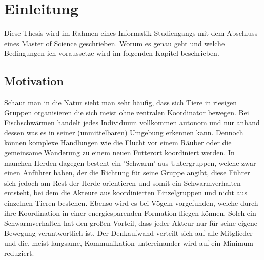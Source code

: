 \chapter{Einleitung}\label{ch:Einleitung}
Diese Thesis wird im Rahmen eines Informatik-Studiengangs mit dem Abschluss eines Master of Science geschrieben. Worum es genau geht und welche Bedingungen ich voraussetze wird im folgenden Kapitel beschrieben.

\section{Motivation}\label{sec:Motivation}
Schaut man in die Natur sieht man sehr häufig, dass sich Tiere in riesigen Gruppen organisieren die sich meist ohne zentralen Koordinator bewegen.
Bei Fischschwärmen handelt jedes Individuum vollkommen autonom und nur anhand dessen was es in seiner (unmittelbaren) Umgebung erkennen kann. Dennoch können komplexe Handlungen wie die Flucht vor einem Räuber oder die gemeinsame Wanderung zu einem neuen Futterort koordiniert werden.
In manchen Herden dagegen besteht ein 'Schwarm' aus Untergruppen, welche zwar einen Anführer haben, der die Richtung für seine Gruppe angibt, diese Führer sich jedoch am Rest der Herde orientieren und somit ein Schwarmverhalten entsteht, bei dem die Akteure aus koordinierten Einzelgruppen und nicht aus einzelnen Tieren bestehen.
Ebenso wird es bei Vögeln vorgefunden, welche durch ihre Koordination in einer energiesparenden Formation fliegen können.
Solch ein Schwarmverhalten hat den großen Vorteil, dass jeder Akteur nur für seine eigene Bewegung verantwortlich ist. Der Denkaufwand verteilt sich auf alle Mitglieder und die, meist langsame, Kommunikation untereinander wird auf ein Minimum reduziert.

